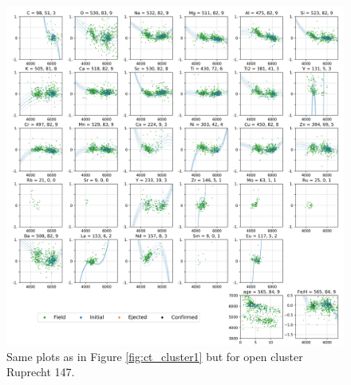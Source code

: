 \begin{figure}
	\centering
	\includegraphics[width=\textwidth]{p_teff_abundances_Ruprecht_147_orbits_DR3_new_flag0.png}
	\caption{Same plots as in Figure \ref{fig:ct_cluster1} but for open cluster Ruprecht 147.}
	\label{fig:ct_cluster4}
\end{figure}

